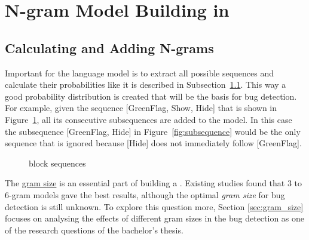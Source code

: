 \section{N-gram Model Building in \scratch{}}\label{sec:model}

\subsection{Calculating and Adding N-grams}\label{subsec:n-grams}
Important for the language model is to extract all possible sequences and calculate their probabilities like it is described in Subsection~\ref{subsec:n-grams}. This way a good probability distribution is created that will be the basis for bug detection. For example, given the sequence [GreenFlag, Show, Hide] that is shown in Figure~\ref{fig:sequences}, all its consecutive subsequences are added to the model. In this case the subsequence [GreenFlag, Hide] in Figure~\ref{fig:subsequence} would be the only sequence that is ignored because [Hide] does not immediately follow [GreenFlag]. 

\begin{figure}[t]
    \centering
    \hfill
    \caption[\scratch{} block sequences]{\label{fig:sequences}\scratch{} block sequences}
    \vspace{-1em}
\end{figure}


The \hyperref[def:gram_size]{gram size} is an essential part of building a \ngram{}. Existing studies found that 3 to 6-gram models gave the best results, although the optimal \textit{gram size} for bug detection is still unknown. To explore this question more, Section \ref{sec:gram_size} focuses on analysing the effects of different gram sizes in the \scratch{} bug detection as one of the research questions of the bachelor's thesis.

